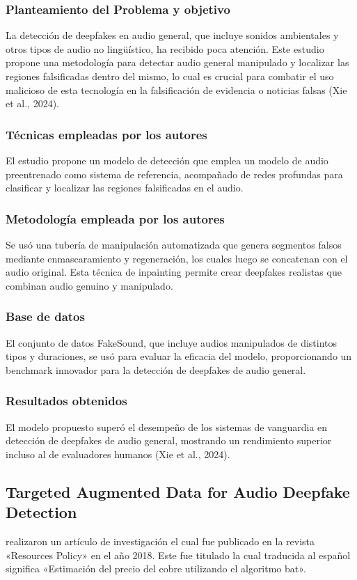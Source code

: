 \subsubsection{Planteamiento del Problema y objetivo }
La detección de deepfakes en audio general, que incluye sonidos ambientales y otros tipos de audio no lingüístico, ha recibido poca atención. Este estudio propone una metodología para detectar audio general manipulado y localizar las regiones falsificadas dentro del mismo, lo cual es crucial para combatir el uso malicioso de esta tecnología en la falsificación de evidencia o noticias falsas (Xie et al., 2024).

\subsubsection{Técnicas empleadas por los autores}
El estudio propone un modelo de detección que emplea un modelo de audio preentrenado como sistema de referencia, acompañado de redes profundas para clasificar y localizar las regiones falsificadas en el audio.

\subsubsection{Metodología empleada por los autores}
Se usó una tubería de manipulación automatizada que genera segmentos falsos mediante enmascaramiento y regeneración, los cuales luego se concatenan con el audio original. Esta técnica de inpainting permite crear deepfakes realistas que combinan audio genuino y manipulado.

\subsubsection{Base de datos}
El conjunto de datos FakeSound, que incluye audios manipulados de distintos tipos y duraciones, se usó para evaluar la eficacia del modelo, proporcionando un benchmark innovador para la detección de deepfakes de audio general.

\subsubsection{Resultados obtenidos}
El modelo propuesto superó el desempeño de los sistemas de vanguardia en detección de deepfakes de audio general, mostrando un rendimiento superior incluso al de evaluadores humanos (Xie et al., 2024).

\subsection{Targeted Augmented Data for Audio Deepfake Detection \citep*{pr_dehghani2018copper}}
\citeauthor{pr_dehghani2018copper} realizaron un artículo de investigación el cual fue publicado en la revista «Resources Policy» en el año 2018. Este fue titulado  la cual traducida al español significa «Estimación del precio del cobre utilizando el algoritmo bat».

